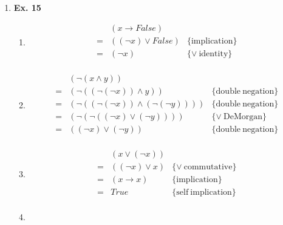 \documentclass{article}
\begin{document}
\begin{enumerate}

    \item {\bf Ex. 15}
      \begin{enumerate}
        \item
          \[ \begin{array}{lll}
              & (x \to False) & \\
            = & ((\neg x) \vee False) & \{\mathrm{implication}\} \\
            = & (\neg x) & \{\vee\mathrm{\ identity}\} \\
          \end{array} \]
        \item
          \[ \begin{array}{lll}
              & (\neg (x \wedge y)) & \\
            = & (\neg ((\neg (\neg x)) \wedge y)) & \{\mathrm{double\ negation}\} \\
            = & (\neg ((\neg (\neg x)) \wedge (\neg (\neg y)))) & \{\mathrm{double\ negation}\} \\
            = & (\neg (\neg ((\neg x) \vee (\neg y)))) & \{\vee \mathrm{\ DeMorgan}\} \\
            = & ((\neg x) \vee (\neg y)) & \{\mathrm{double\ negation}\} \\
          \end{array} \]
        \item
          \[ \begin{array}{lll}
              & (x \vee (\neg x)) & \\
            = & ((\neg x) \vee x) & \{\vee \mathrm{\ commutative}\} \\
            = & (x \to x) & \{\mathrm{implication}\} \\
            = & True & \{\mathrm{self\ implication}\} \\
          \end{array} \]
        \item
          \[ \begin{array}{lll}

\end{array}\]
\end{enumerate}
\end{enumerate}
\end{document}
